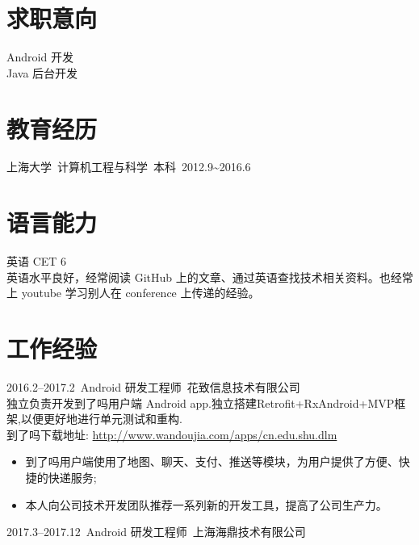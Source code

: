 \documentclass[11pt]{res}
\begin{document}
\address{  beatbox\_gao@hotmail.com\\ GitHub: \url{https://github.com/abcghy} \\ Blog: \url{http://abcghy.github.io}}
\address{上海宝山 \\  18818217393 17602152878}

\begin{resume}

\section{求职意向}
  Android 开发\\    
  Java 后台开发

\section{教育经历}
  上海大学\ 计算机工程与科学\ 本科\ 2012.9\~{}2016.6

\section{语言能力}
  英语 CET 6 \\英语水平良好，经常阅读 GitHub 上的文章、通过英语查找技术相关资料。也经常上 youtube 学习别人在 conference 上传递的经验。

\section{工作经验}
  2016.2--2017.2\ Android 研发工程师\ 花致信息技术有限公司\\独立负责开发到了吗用户端 Android app.独立搭建Retrofit+RxAndroid+MVP框架,以便更好地进行单元测试和重构.\\到了吗下载地址: \url{http://www.wandoujia.com/apps/cn.edu.shu.dlm}
  \begin{itemize}
    \item 到了吗用户端使用了地图、聊天、支付、推送等模块，为用户提供了方便、快捷的快递服务;
    \item 本人向公司技术开发团队推荐一系列新的开发工具，提高了公司生产力。
  \end{itemize}
  2017.3--2017.12\ Android 研发工程师\ 上海海鼎技术有限公司\\


\end{resume}
\end{document}

